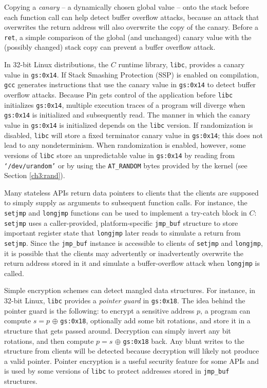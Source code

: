  \newline
Copying a \emph{canary} -- a dynamically chosen global value -- onto the
stack before each function call can help detect buffer overflow attacks, because 
an attack that overwrites the return address will also overwrite
the copy of the canary. Before a \texttt{ret}, a simple comparison 
of the global (and unchanged) canary
value with the (possibly changed) stack copy can prevent a buffer overflow attack.

In 32-bit Linux distributions, the $C$ runtime library, 
\texttt{libc}, provides a canary value in \texttt{gs:0x14}.
If Stack Smashing Protection (SSP) is enabled on compilation,
\texttt{gcc} generates instructions that use the canary value
in \texttt{gs:0x14} to detect buffer overflow attacks.
Because Pin gets control of the application before \texttt{libc}
initializes \texttt{gs:0x14}, multiple execution traces of a program
will diverge when \texttt{gs:0x14} is initialized and subsequently
read.  The manner in which the canary value in \texttt{gs:0x14} is initialized
depends on the \texttt{libc} version.
If randomization is disabled, \texttt{libc} will store a fixed
terminator canary value in \texttt{gs:0x14}; this does not lead to any nondeterminism.
When randomization is enabled, however,  
some versions of \texttt{libc} store an unpredictable value in \texttt{gs:0x14} 
by reading from \texttt{`/dev/urandom'}
or by using the \texttt{AT\_RANDOM} bytes provided by the kernel (see
Section \ref{ch3:rand}). 

\newpage
{} \newline
Many stateless APIs return data pointers to clients 
that the clients are supposed to simply supply as arguments
to subsequent function calls. 
For instance, the \texttt{setjmp} and \texttt{longjmp} functions
can be used to implement a try-catch block in $C$: \texttt{setjmp} uses 
a caller-provided, platform-specific \texttt{jmp\_buf} structure
to store important register state that \texttt{longjmp} 
later reads to simulate a return from \texttt{setjmp}.
Since the \texttt{jmp\_buf} instance is accessible to clients of \texttt{setjmp}
and \texttt{longjmp}, it is possible that the clients may advertently or inadvertently
overwrite the return address stored in it and simulate a buffer-overflow attack
when \texttt{longjmp} is called.

Simple encryption schemes can detect mangled data structures.
For instance, in 32-bit Linux, \texttt{libc} provides
a {\em pointer guard}  in \texttt{gs:0x18}. 
The idea behind the pointer guard is the following: 
to encrypt a sensitive address $p$, a program
can compute $s = p$  $\oplus  $ \texttt{gs:0x18}, 
optionally add some bit rotations, and store it in a structure
that gets passed around. Decryption can simply invert any bit rotations, 
and then compute $p = s$ $\oplus  $ \texttt{gs:0x18} back. 
Any blunt writes to the structure from clients will be detected because
decryption will likely not produce a valid pointer. 
Pointer encryption is a useful security feature for some APIs
and is used by some versions of \texttt{libc} to protect addresses stored in \texttt{jmp\_buf}
structures.

